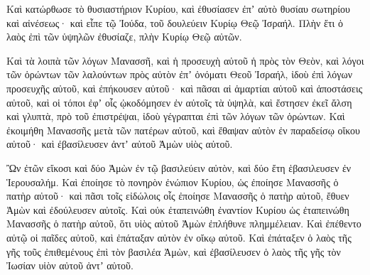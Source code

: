 {Καὶ κατώρθωσε τὸ θυσιαστήριον Κυρίου, καὶ ἐθυσίασεν ἐπʼ αὐτὸ θυσίαυ σωτηρίου καὶ αἰνέσεως· καὶ εἶπε τῷ Ἰούδα, τοῦ δουλεύειν Κυρίῳ Θεῷ Ἰσραήλ.
Πλὴν ἔτι ὁ λαὸς ἐπὶ τῶν ὑψηλῶν ἐθυσίαζε, πλὴν Κυρίῳ Θεῷ αὐτῶν.
\par }{\PP {}Καὶ τὰ λοιπὰ τῶν λόγων Μανασσῆ, καὶ ἡ προσευχὴ αὐτοῦ ἡ πρὸς τὸν Θεὸν, καὶ λόγοι τῶν ὁρώντων τῶν λαλούντων πρὸς αὐτὸν ἐπʼ ὀνόματι Θεοῦ Ἰσραήλ,
ἰδοὺ ἐπὶ λόγων προσευχῆς αὐτοῦ, καὶ ἐπήκουσεν αὐτοῦ· καὶ πᾶσαι αἱ ἁμαρτίαι αὐτοῦ καὶ ἀποστάσεις αὐτοῦ, καὶ οἱ τόποι ἐφʼ οἷς ᾠκοδόμησεν ἐν αὐτοῖς τὰ ὑψηλὰ, καὶ ἔστησεν ἐκεῖ ἄλση καὶ γλυπτὰ, πρὸ τοῦ ἐπιστρέψαι, ἰδοὺ γέγραπται ἐπὶ τῶν λόγων τῶν ὁρώντων.
Καὶ ἐκοιμήθη Μανασσῆς μετὰ τῶν πατέρων αὐτοῦ, καὶ ἔθαψαν αὐτὸν ἐν παραδείσῳ οἴκου αὐτοῦ· καὶ ἐβασίλευσεν ἀντʼ αὐτοῦ Ἀμὼν υἱὸς αὐτοῦ.
\par }{\PP {}Ὢν ἐτῶν εἴκοσι καὶ δύο Ἀμὼν ἐν τῷ βασιλεύειν αὐτὸν, καὶ δύο ἔτη ἑβασιλευσεν ἐν Ἱερουσαλήμ.
Καὶ ἐποίησε τὸ πονηρὸν ἐνώπιον Κυρίου, ὡς ἐποίησε Μανασσῆς ὁ πατὴρ αὐτοῦ· καὶ πᾶσι τοῖς εἰδώλοις οἷς ἐποίησε Μανασσῆς ὁ πατὴρ αὐτοῦ, ἔθυεν Ἀμὼν καὶ ἐδούλευσεν αὐτοῖς.
Καὶ οὐκ ἐταπεινώθη ἐναντίον Κυρίου ὡς ἐταπεινώθη Μανασσῆς ὁ πατὴρ αὐτοῦ, ὅτι υἱὸς αὐτοῦ Ἀμὼν ἐπλήθυνε πλημμέλειαν.
Καὶ ἐπέθεντο αὐτῷ οἱ παῖδες αὐτοῦ, καὶ ἐπάταξαν αὐτὸν ἐν οἴκῳ αὐτοῦ.
Καὶ ἐπάταξεν ὁ λαὸς τῆς γῆς τοῦς ἐπιθεμένους ἐπὶ τὸν βασιλέα Ἀμὼν, καὶ ἐβασίλευσεν ὁ λαὸς τῆς γῆς τὸν Ἰωσίαν υἱὸν αὐτοῦ ἀντʼ αὐτοῦ.

}
